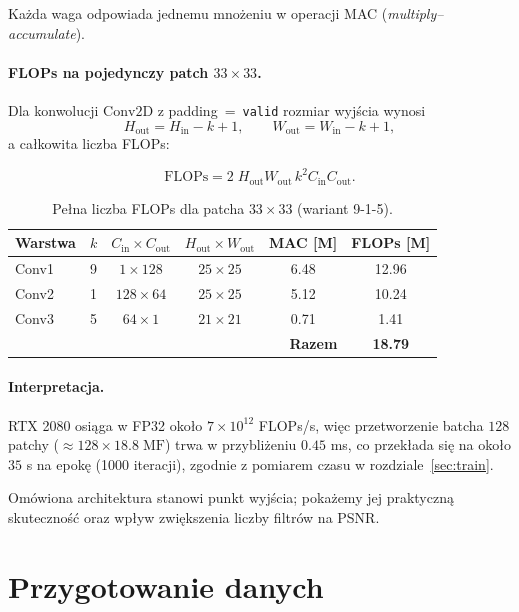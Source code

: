 \documentclass[11pt]{article}
\begin{document}
Każda waga odpowiada jednemu mnożeniu w operacji MAC
(\emph{multiply–accumulate}).

\bigskip
\paragraph{FLOPs na pojedynczy patch \(33\times33\).}

Dla konwolucji \(\text{Conv2D}\) z padding~=~\texttt{valid} rozmiar wyjścia
wynosi
\[
  H_\text{out}=H_\text{in}-k+1,\qquad
  W_\text{out}=W_\text{in}-k+1,
\]
a całkowita liczba FLOPs:

\[
  \text{FLOPs}=2\;H_\text{out}W_\text{out}\,k^{2}C_\text{in}C_\text{out}.
\]

\begin{table}[h]
\centering
\begin{tabular}{@{}lccccc@{}}
\toprule
Warstwa & $k$ & $C_\text{in}\!\times C_\text{out}$ &
$H_\text{out}\!\times W_\text{out}$ & MAC [M] & FLOPs [M] \\ \midrule
Conv1 & 9 & $1\times 128$   & $25\times25$ & 6.48 & 12.96 \\
Conv2 & 1 & $128\times 64$  & $25\times25$ & 5.12 & 10.24 \\
Conv3 & 5 & $64\times 1$    & $21\times21$ & 0.71 & 1.41  \\ \midrule
\multicolumn{5}{r}{\textbf{Razem}} & \textbf{18.79} \\
\bottomrule
\end{tabular}
\caption{Pełna liczba FLOPs dla patcha \(33\times33\) (wariant 9-1-5).}
\label{tab:flops}
\end{table}

\paragraph{Interpretacja.}
RTX 2080 osiąga w FP32 około \(7\!\times\!10^{12}\) FLOPs/s, więc
przetworzenie batcha \(128\) patchy (\(\approx 128\!\times18.8\;\text{MF}\))
trwa w przybliżeniu \(0.45\) ms, co przekłada się na
około \(35\) s na epokę (1000 iteracji), zgodnie z pomiarem czasu w
rozdziale~\ref{sec:train}.

\bigskip
Omówiona architektura stanowi punkt wyjścia; 
pokażemy jej praktyczną skuteczność oraz wpływ zwiększenia liczby filtrów
na PSNR.

\section{Przygotowanie danych}
\label{sec:data}
\end{document}

